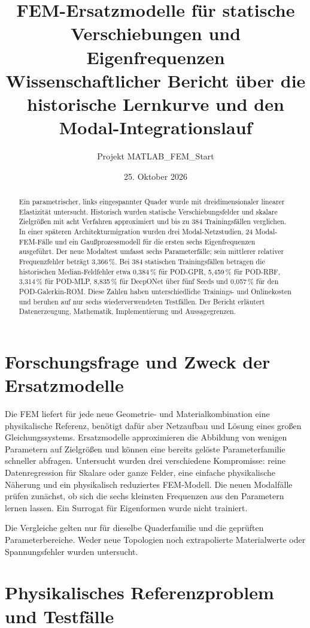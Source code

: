 \documentclass[11pt,a4paper]{article}
\title{FEM-Ersatzmodelle für statische Verschiebungen und Eigenfrequenzen\\
\large Wissenschaftlicher Bericht über die historische Lernkurve und den Modal-Integrationslauf}
\author{Projekt MATLAB\_FEM\_Start}
\date{25. Oktober 2026}
\begin{document}
\maketitle
\begin{abstract}
Ein parametrischer, links eingespannter Quader wurde mit dreidimensionaler linearer Elastizität untersucht. Historisch wurden statische Verschiebungsfelder und skalare Zielgrößen mit acht Verfahren approximiert und bis zu 384 Trainingsfällen verglichen. In einer späteren Architekturmigration wurden drei Modal-Netzstudien, 24 Modal-FEM-Fälle und ein Gaußprozessmodell für die ersten sechs Eigenfrequenzen ausgeführt. Der neue Modaltest umfasst sechs Parameterfälle; sein mittlerer relativer Frequenzfehler beträgt 3,366\,\%. Bei 384 statischen Trainingsfällen betragen die historischen Median-Feldfehler etwa 0,384\,\% für POD-GPR, 5,459\,\% für POD-RBF, 3,314\,\% für POD-MLP, 8,835\,\% für DeepONet über fünf Seeds und 0,057\,\% für den POD-Galerkin-ROM. Diese Zahlen haben unterschiedliche Trainings- und Onlinekosten und beruhen auf nur sechs wiederverwendeten Testfällen. Der Bericht erläutert Datenerzeugung, Mathematik, Implementierung und Aussagegrenzen.
\end{abstract}
\tableofcontents
\newpage
\section{Forschungsfrage und Zweck der Ersatzmodelle}
Die FEM liefert für jede neue Geometrie- und Materialkombination eine physikalische Referenz, benötigt dafür aber Netzaufbau und Lösung eines großen Gleichungssystems. Ersatzmodelle approximieren die Abbildung von wenigen Parametern auf Zielgrößen und können eine bereits gelöste Parameterfamilie schneller abfragen. Untersucht wurden drei verschiedene Kompromisse: reine Datenregression für Skalare oder ganze Felder, eine einfache physikalische Näherung und ein physikalisch reduziertes FEM-Modell. Die neuen Modalfälle prüfen zunächst, ob sich die sechs kleinsten Frequenzen aus den Parametern lernen lassen. Ein Surrogat für Eigenformen wurde nicht trainiert.

Die Vergleiche gelten nur für dieselbe Quaderfamilie und die geprüften Parameterbereiche. Weder neue Topologien noch extrapolierte Materialwerte oder Spannungsfehler wurden untersucht.

\section{Physikalisches Referenzproblem und Testfälle}
\end{document}
